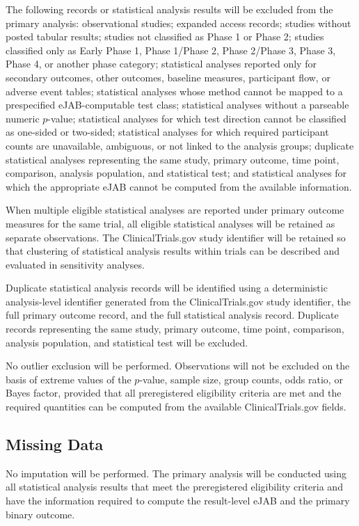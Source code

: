 \documentclass[11pt]{article}
\begin{document}
The following records or statistical analysis results will be excluded from the primary analysis: observational studies; expanded access records; studies without posted tabular results; studies not classified as Phase 1 or Phase 2; studies classified only as Early Phase 1, Phase 1/Phase 2, Phase 2/Phase 3, Phase 3, Phase 4, or another phase category; statistical analyses reported only for secondary outcomes, other outcomes, baseline measures, participant flow, or adverse event tables; statistical analyses whose method cannot be mapped to a prespecified eJAB-computable test class; statistical analyses without a parseable numeric \(p\)-value; statistical analyses for which test direction cannot be classified as one-sided or two-sided; statistical analyses for which required participant counts are unavailable, ambiguous, or not linked to the analysis groups; duplicate statistical analyses representing the same study, primary outcome, time point, comparison, analysis population, and statistical test; and statistical analyses for which the appropriate eJAB cannot be computed from the available information.

When multiple eligible statistical analyses are reported under primary outcome measures for the same trial, all eligible statistical analyses will be retained as separate observations. The ClinicalTrials.gov study identifier will be retained so that clustering of statistical analysis results within trials can be described and evaluated in sensitivity analyses.

Duplicate statistical analysis records will be identified using a deterministic analysis-level identifier generated from the ClinicalTrials.gov study identifier, the full primary outcome record, and the full statistical analysis record. Duplicate records representing the same study, primary outcome, time point, comparison, analysis population, and statistical test will be excluded.

No outlier exclusion will be performed. Observations will not be excluded on the basis of extreme values of the \(p\)-value, sample size, group counts, odds ratio, or Bayes factor, provided that all preregistered eligibility criteria are met and the required quantities can be computed from the available ClinicalTrials.gov fields.

\subsection{Missing Data}

No imputation will be performed. The primary analysis will be conducted using all statistical analysis results that meet the preregistered eligibility criteria and have the information required to compute the result-level eJAB and the primary binary outcome.
\end{document}
